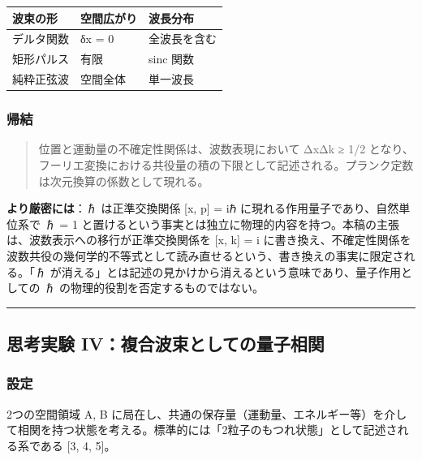 \documentclass[
]{ltjsarticle}
\newcounter{none} %
\begin{document}
{\def\LTcaptype{none} %
\begin{longtable}[]{@{}lll@{}}
\toprule\noalign{}
波束の形 & 空間広がり & 波長分布 \\
\midrule\noalign{}
\endhead
\bottomrule\noalign{}
\endlastfoot
デルタ関数 & δx = 0 & 全波長を含む \\
矩形パルス & 有限 & sinc 関数 \\
純粋正弦波 & 空間全体 & 単一波長 \\
\end{longtable}
}

\subsubsection{帰結}\label{ux5e30ux7d50-2}

\begin{quote}
位置と運動量の不確定性関係は、波数表現において ΔxΔk ≥ 1/2
となり、フーリエ変換における共役量の積の下限として記述される。プランク定数は次元換算の係数として現れる。
\end{quote}

\textbf{より厳密には}：ℏ は正準交換関係 {[}x, p{]} = iℏ
に現れる作用量子であり、自然単位系で ℏ = 1
と置けるという事実とは独立に物理的内容を持つ。本稿の主張は、波数表示への移行が正準交換関係を
{[}x, k{]} = i
に書き換え、不確定性関係を波数共役の幾何学的不等式として読み直せるという、書き換えの事実に限定される。「ℏ
が消える」とは記述の見かけから消えるという意味であり、量子作用としての ℏ
の物理的役割を否定するものではない。

\begin{center}\rule{0.5\linewidth}{0.5pt}\end{center}

\subsection{思考実験
IV：複合波束としての量子相関}\label{ux601dux8003ux5b9fux9a13-ivux8907ux5408ux6ce2ux675fux3068ux3057ux3066ux306eux91cfux5b50ux76f8ux95a2}

\subsubsection{設定}\label{ux8a2dux5b9a-3}

2つの空間領域 A, B
に局在し、共通の保存量（運動量、エネルギー等）を介して相関を持つ状態を考える。標準的には「2粒子のもつれ状態」として記述される系である
{[}3, 4, 5{]}。
\end{document}
